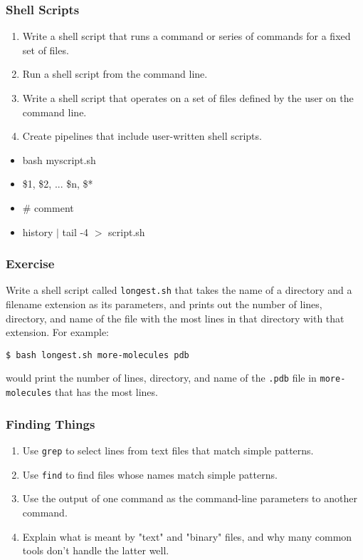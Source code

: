 \documentclass[xcolor=dvipsnames]{beamer}
\begin{document}
\begin{frame}
\frametitle{Shell Scripts}
\begin{enumerate}
\item Write a shell script that runs a command or series of commands for a fixed set of files.
\item Run a shell script from the command line.
\item Write a shell script that operates on a set of files defined by the user on the command line.
\item Create pipelines that include user-written shell scripts.
\end{enumerate}
\begin{multicols}{2}
\begin{itemize}
  \item bash myscript.sh
  \item \$1, \$2, ... \$n, \$*
  \item \# comment
  \item history $|$ tail -4 $>$ script.sh
\end{itemize}
\end{multicols}
\end{frame}


\begin{frame}[fragile]
\frametitle{Exercise}
Write a shell script called {\tt longest.sh} that takes the name of a directory and a filename extension as its parameters,
and prints out the number of lines,
directory,
and name of the file with the most lines in that directory with that extension.
For example:

\begin{verbatim}
$ bash longest.sh more-molecules pdb
\end{verbatim}

would print the number of lines,
directory,
and name of the {\tt .pdb} file in {\tt more-molecules} that has
the most lines.
\end{frame}


\begin{frame}
\frametitle{Finding Things}
\begin{enumerate}
  \item Use {\tt grep} to select lines from text files that match simple patterns.
  \item Use {\tt find} to find files whose names match simple patterns.
  \item Use the output of one command as the command-line parameters to another command.
  \item Explain what is meant by "text" and "binary" files, and why many common tools don't handle the latter well.
\end{enumerate}
\end{frame}
\end{document}
